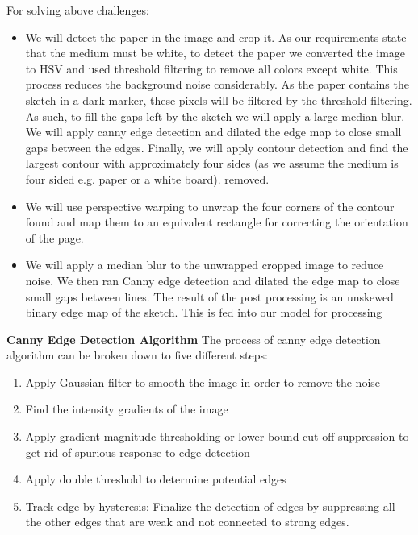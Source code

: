 \documentclass{ioereport}
\begin{document}
For solving above challenges:
\begin{itemize}
    \item We will detect the paper in the image and crop it. As our requirements state that
the medium must be white, to detect the paper we converted the image to HSV
and used threshold filtering to remove all colors except white. This process
reduces the background noise considerably. As the paper contains the sketch in
a dark marker, these pixels will be filtered by the threshold filtering. As such,
to fill the gaps left by the sketch we will apply a large median blur. We will
apply canny edge detection and dilated the edge map to close small gaps
between the edges. Finally, we will apply contour detection and find the largest
contour with approximately four sides (as we assume the medium is four sided
e.g. paper or a white board).
removed. 
    \item We will use perspective warping to unwrap the four corners of the contour found
and map them to an equivalent rectangle for correcting the orientation of the
page.
    \item We will apply a median blur to the unwrapped cropped image to reduce noise.
We then ran Canny edge detection and dilated the edge map to close small gaps
between lines. The result of the post processing is an unskewed binary edge map
of the sketch. This is fed into our model for processing
\end{itemize}
\textbf{Canny Edge Detection Algorithm}
The process of canny edge detection algorithm can be broken down to five different
steps: 
\begin{enumerate}
    \item Apply Gaussian filter to smooth the image in order to remove the noise
    \item Find the intensity gradients of the image
    \item Apply gradient magnitude thresholding or lower bound cut-off suppression to
get rid of spurious response to edge detection
    \item Apply double threshold to determine potential edges
    \item Track edge by hysteresis: Finalize the detection of edges by suppressing all the
other edges that are weak and not connected to strong edges.
\end{enumerate}
\end{document}
